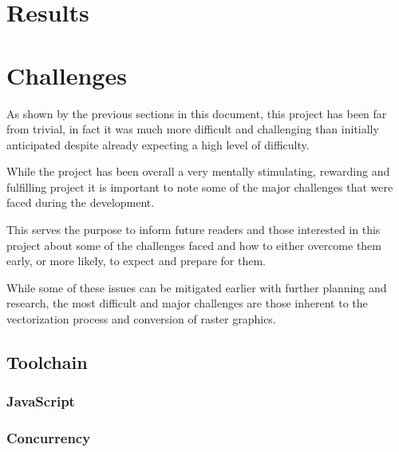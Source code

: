 \documentclass[12pt]{article}
\newcommand{\sentence}{} %
\begin{document}
    \pagebreak


    \section{Results}\label{sec:results}

    \pagebreak


    \section{Challenges}\label{sec:challenges}

    \tab
    As shown by the previous sections in this document, this project has been far from trivial, in fact it was much
    more difficult and challenging than initially anticipated despite already expecting a high level of difficulty.
    \sentence
    While the project has been overall a very mentally stimulating, rewarding and fulfilling project it is important
    to note some of the major challenges that were faced during the development.
    \sentence
    This serves the purpose to inform future readers and those interested in this project about some of the
    challenges faced and how to either overcome them early, or more likely, to expect and prepare for them.
    \sentence
    While some of these issues can be mitigated earlier with further planning and research, the most difficult and
    major challenges are those inherent to the vectorization process and conversion of raster graphics.

    \subsection{Toolchain}\label{subsec:toolchain2}


    \subsubsection{JavaScript}\label{subsubsec:javascript}

    \subsubsection{Concurrency}\label{subsubsec:concurrency}
\end{document}
